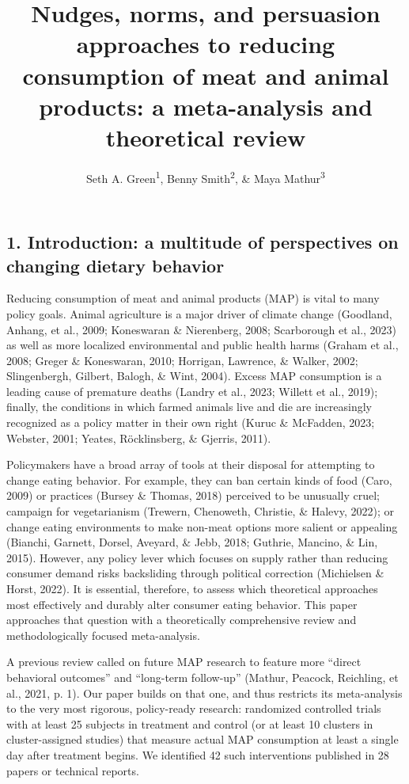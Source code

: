 \documentclass[
  man]{apa6}
\title{Nudges, norms, and persuasion approaches to reducing consumption of meat and animal products: a meta-analysis and theoretical review}
\author{Seth A. Green\textsuperscript{1}, Benny Smith\textsuperscript{2}, \& Maya Mathur\textsuperscript{3}}
\date{}
\affiliation{\vspace{0.5cm}\textsuperscript{1} Kahneman-Treisman Center, Princeton University\\\textsuperscript{2} Allied Scholars for Animal Protection\\\textsuperscript{3} Stanford University}
\begin{document}
\maketitle

\subsection{1. Introduction: a multitude of perspectives on changing dietary behavior}\label{introduction-a-multitude-of-perspectives-on-changing-dietary-behavior}

Reducing consumption of meat and animal products (MAP) is vital to many policy goals. Animal agriculture is a major driver of climate change (Goodland, Anhang, et al., 2009; Koneswaran \& Nierenberg, 2008; Scarborough et al., 2023) as well as more localized environmental and public health harms (Graham et al., 2008; Greger \& Koneswaran, 2010; Horrigan, Lawrence, \& Walker, 2002; Slingenbergh, Gilbert, Balogh, \& Wint, 2004). Excess MAP consumption is a leading cause of premature deaths (Landry et al., 2023; Willett et al., 2019); finally, the conditions in which farmed animals live and die are increasingly recognized as a policy matter in their own right (Kuruc \& McFadden, 2023; Webster, 2001; Yeates, Röcklinsberg, \& Gjerris, 2011).

Policymakers have a broad array of tools at their disposal for attempting to change eating behavior. For example, they can ban certain kinds of food (Caro, 2009) or practices (Bursey \& Thomas, 2018) perceived to be unusually cruel; campaign for vegetarianism (Trewern, Chenoweth, Christie, \& Halevy, 2022); or change eating environments to make non-meat options more salient or appealing (Bianchi, Garnett, Dorsel, Aveyard, \& Jebb, 2018; Guthrie, Mancino, \& Lin, 2015). However, any policy lever which focuses on supply rather than reducing consumer demand risks backsliding through political correction (Michielsen \& Horst, 2022). It is essential, therefore, to assess which theoretical approaches most effectively and durably alter consumer eating behavior. This paper approaches that question with a theoretically comprehensive review and methodologically focused meta-analysis.

A previous review called on future MAP research to feature more ``direct behavioral outcomes'' and ``long-term follow-up'' (Mathur, Peacock, Reichling, et al., 2021, p. 1). Our paper builds on that one, and thus restricts its meta-analysis to the very most rigorous, policy-ready research: randomized controlled trials with at least 25 subjects in treatment and control (or at least 10 clusters in cluster-assigned studies) that measure actual MAP consumption at least a single day after treatment begins. We identified 42 such interventions published in 28 papers or technical reports.
\end{document}
